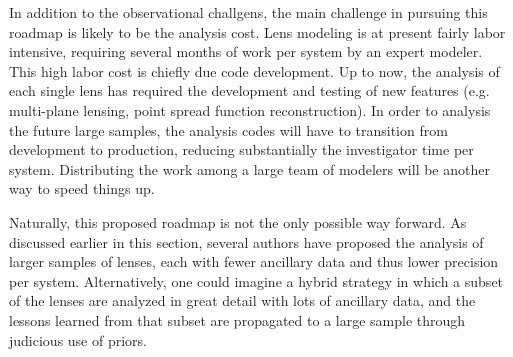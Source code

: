 In addition to the observational challgens, the main challenge in
pursuing this roadmap is likely to be the analysis cost. Lens modeling
is at present fairly labor intensive, requiring several months of work
per system by an expert modeler. This high labor cost is chiefly due
code development. Up to now, the analysis of each single lens has
required the development and testing of new features (e.g. multi-plane
lensing, point spread function reconstruction). In order to analysis
the future large samples, the analysis codes will have to transition
from development to production, reducing substantially the
investigator time per system. Distributing the work among a large team
of modelers will be another way to speed things up.

Naturally, this proposed roadmap is not the only possible way
forward. As discussed earlier in this section, several authors have
proposed the analysis of larger samples of lenses, each with fewer
ancillary data and thus lower precision per system. Alternatively, one
could imagine a hybrid strategy in which a subset of the lenses are
analyzed in great detail with lots of ancillary data, and the lessons
learned from that subset are propagated to a large sample through
judicious use of priors.
